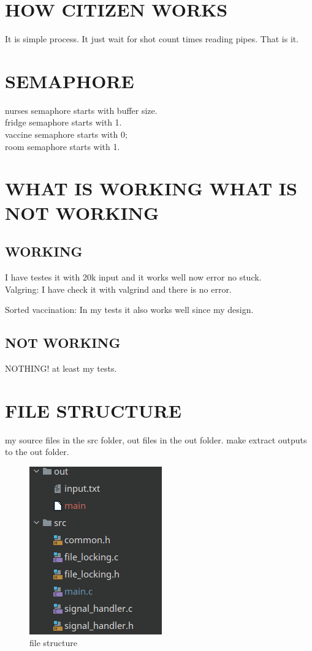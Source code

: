 \documentclass{article}
\begin{document}
\section{HOW CITIZEN WORKS}
It is simple process. It just wait for shot count times reading pipes. That is it.
\pagebreak


\section{SEMAPHORE}
nurses semaphore starts with buffer size.\\

fridge semaphore starts with 1.\\

vaccine semaphore starts with 0;\\

room semaphore starts with 1.\\


\section{WHAT IS WORKING WHAT IS NOT WORKING}
\subsection{WORKING}
I have testes it with 20k input and it works well now error no stuck.\\

Valgring: I have check it with valgrind and there is no error.

Sorted vaccination: In my tests it also works well since my design.

\subsection{NOT WORKING}
NOTHING! at least my tests.
\pagebreak
\section{FILE STRUCTURE}
my source files in the src folder, out files in the out folder. 
make extract outputs to the out folder.
\begin{figure}
    \includegraphics{files.png}
    \caption{file structure}
    \label{fig:my_label}
\end{figure}
\end{document}
